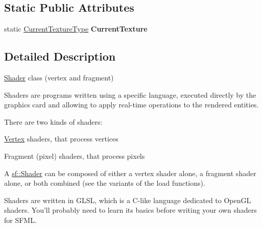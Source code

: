 \subsection*{Static Public Attributes}
\begin{DoxyCompactItemize}
\item 
\hypertarget{classsf_1_1Shader_ac84c7953eec2e19358ea6e2cc5385b8d}{static \hyperlink{structsf_1_1Shader_1_1CurrentTextureType}{Current\-Texture\-Type} {\bfseries Current\-Texture}}\label{classsf_1_1Shader_ac84c7953eec2e19358ea6e2cc5385b8d}

\end{DoxyCompactItemize}


\subsection{Detailed Description}
\hyperlink{classsf_1_1Shader}{Shader} class (vertex and fragment) 

Shaders are programs written using a specific language, executed directly by the graphics card and allowing to apply real-\/time operations to the rendered entities.

There are two kinds of shaders\-: \begin{DoxyItemize}
\item \hyperlink{classsf_1_1Vertex}{Vertex} shaders, that process vertices \item Fragment (pixel) shaders, that process pixels\end{DoxyItemize}
A \hyperlink{classsf_1_1Shader}{sf\-::\-Shader} can be composed of either a vertex shader alone, a fragment shader alone, or both combined (see the variants of the load functions).

Shaders are written in G\-L\-S\-L, which is a C-\/like language dedicated to Open\-G\-L shaders. You'll probably need to learn its basics before writing your own shaders for S\-F\-M\-L.

